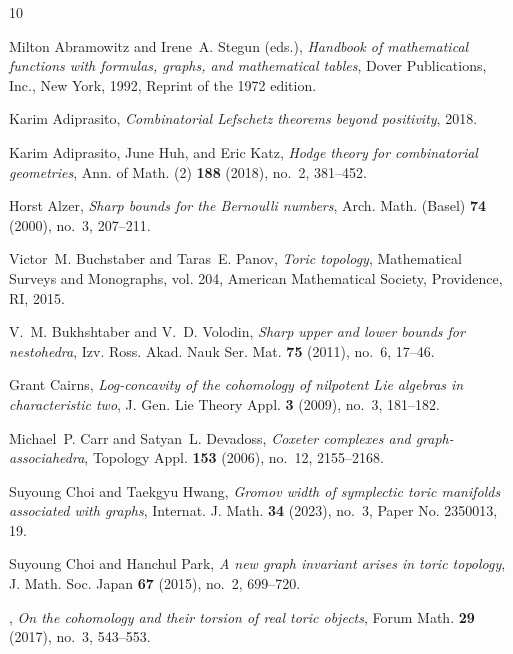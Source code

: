 \documentclass[10pt]{amsart}
\theoremstyle{plain}
\numberwithin{equation}{section}
\theoremstyle{definition}
\begin{document}
\begin{thebibliography}{10}

Milton Abramowitz and Irene~A. Stegun (eds.), \emph{Handbook of mathematical
  functions with formulas, graphs, and mathematical tables}, Dover
  Publications, Inc., New York, 1992, Reprint of the 1972 edition. 

Karim Adiprasito, \emph{Combinatorial {L}efschetz theorems beyond positivity},
  2018.

Karim Adiprasito, June Huh, and Eric Katz, \emph{Hodge theory for combinatorial
  geometries}, Ann. of Math. (2) \textbf{188} (2018), no.~2, 381--452.

Horst Alzer, \emph{Sharp bounds for the {B}ernoulli numbers}, Arch. Math.
  (Basel) \textbf{74} (2000), no.~3, 207--211. 

Victor~M. Buchstaber and Taras~E. Panov, \emph{Toric topology}, Mathematical
  Surveys and Monographs, vol. 204, American Mathematical Society, Providence,
  RI, 2015. 

V.~M. Bukhshtaber and V.~D. Volodin, \emph{Sharp upper and lower bounds for
  nestohedra}, Izv. Ross. Akad. Nauk Ser. Mat. \textbf{75} (2011), no.~6,
  17--46. 

Grant Cairns, \emph{Log-concavity of the cohomology of nilpotent {L}ie algebras
  in characteristic two}, J. Gen. Lie Theory Appl. \textbf{3} (2009), no.~3,
  181--182. 

Michael~P. Carr and Satyan~L. Devadoss, \emph{Coxeter complexes and
  graph-associahedra}, Topology Appl. \textbf{153} (2006), no.~12, 2155--2168.

Suyoung Choi and Taekgyu Hwang, \emph{Gromov width of symplectic toric
  manifolds associated with graphs}, Internat. J. Math. \textbf{34} (2023),
  no.~3, Paper No. 2350013, 19. 

Suyoung Choi and Hanchul Park, \emph{A new graph invariant arises in toric
  topology}, J. Math. Soc. Japan \textbf{67} (2015), no.~2, 699--720.

\bysame, \emph{On the cohomology and their torsion of real toric objects},
  Forum Math. \textbf{29} (2017), no.~3, 543--553. 


\end{thebibliography}
\end{document}
